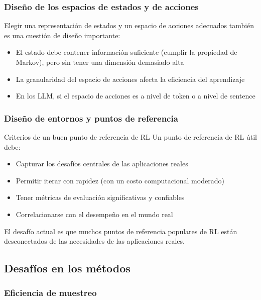 \documentclass[a4paper]{article}
\begin{document}
\subsubsection{Diseño de los espacios de estados y de acciones}

Elegir una representación de estados y un espacio de acciones adecuados también es una cuestión de diseño importante:
\begin{itemize}
    \item El estado debe contener información suficiente (cumplir la propiedad de Markov), pero sin tener una dimensión demasiado alta
    \item La granularidad del espacio de acciones afecta la eficiencia del aprendizaje
    \item En los LLM, si el espacio de acciones es a nivel de token o a nivel de sentence
\end{itemize}

\subsubsection{Diseño de entornos y puntos de referencia}

\begin{knowledgebox}{Criterios de un buen punto de referencia de RL}
Un punto de referencia de RL útil debe:
\begin{itemize}
    \item Capturar los desafíos centrales de las aplicaciones reales
    \item Permitir iterar con rapidez (con un costo computacional moderado)
    \item Tener métricas de evaluación significativas y confiables
    \item Correlacionarse con el desempeño en el mundo real
\end{itemize}
El desafío actual es que muchos puntos de referencia populares de RL están desconectados de las necesidades de las aplicaciones reales.
\end{knowledgebox}

\subsection{Desafíos en los métodos}

\subsubsection{Eficiencia de muestreo}
\end{document}
